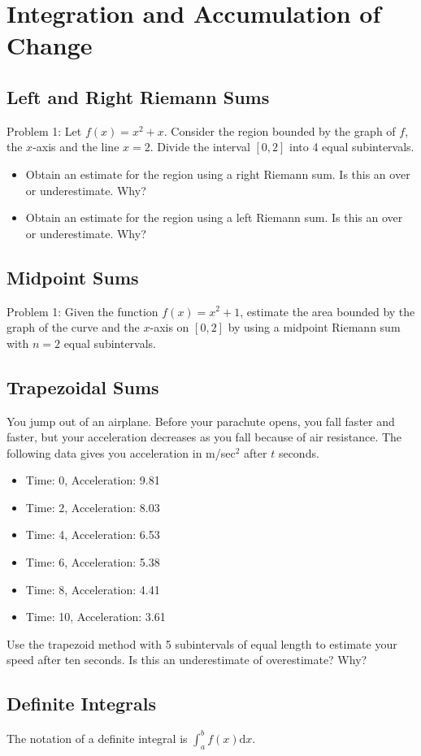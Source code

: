 \documentclass[../abcalc.tex]{subfiles}
\begin{document}
\chapter{Integration and Accumulation of Change}
\section{Left and Right Riemann Sums}
Problem 1: Let $f(x)=x^2+x$. Consider the region bounded by the graph of $f$, the $x$-axis and the line $x=2$. Divide the interval $[0,2]$ 
into 4 equal subintervals.
\begin{itemize}
    \item Obtain an estimate for the region using a right Riemann sum. Is this an over or underestimate. Why?
    \item Obtain an estimate for the region using a left Riemann sum. Is this an over or underestimate. Why?
\end{itemize}
\section{Midpoint Sums}
Problem 1: Given the function $f(x)=x^2+1$, estimate the area bounded by the graph of the curve and the $x$-axis on $[0,2]$ by using a 
midpoint Riemann sum with $n=2$ equal subintervals.
\section{Trapezoidal Sums}
You jump out of an airplane. Before your parachute opens, you fall faster and faster, but your acceleration decreases as you fall because 
of air resistance. 
The following data gives you acceleration in m/sec$^2$ after $t$ seconds.
\begin{itemize}
    \item Time: 0, Acceleration: 9.81
    \item Time: 2, Acceleration: 8.03
    \item Time: 4, Acceleration: 6.53
    \item Time: 6, Acceleration: 5.38
    \item Time: 8, Acceleration: 4.41
    \item Time: 10, Acceleration: 3.61
\end{itemize}
Use the trapezoid method with 5 subintervals of equal length to estimate your speed after ten seconds. Is this an underestimate of overestimate? Why?
\section{Definite Integrals}
The notation of a definite integral is $\int_a^b f(x)\mathrm{d}x$.
\end{document}
